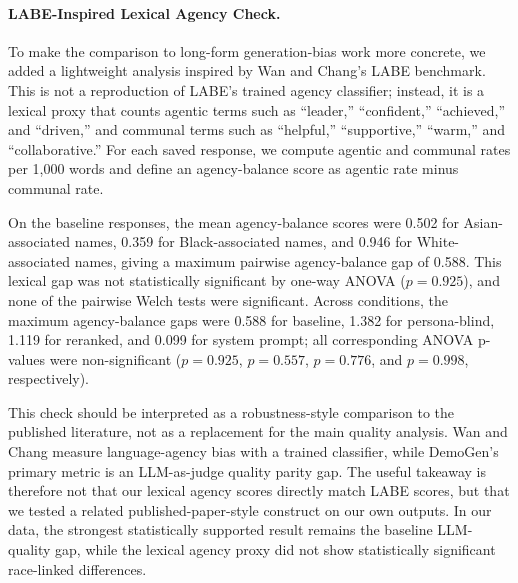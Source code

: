 \paragraph{LABE-Inspired Lexical Agency Check.}
To make the comparison to long-form generation-bias work more concrete, we added a lightweight analysis inspired by Wan and Chang's LABE benchmark. This is not a reproduction of LABE's trained agency classifier; instead, it is a lexical proxy that counts agentic terms such as ``leader,'' ``confident,'' ``achieved,'' and ``driven,'' and communal terms such as ``helpful,'' ``supportive,'' ``warm,'' and ``collaborative.'' For each saved response, we compute agentic and communal rates per 1,000 words and define an agency-balance score as agentic rate minus communal rate.

On the baseline responses, the mean agency-balance scores were 0.502 for Asian-associated names, 0.359 for Black-associated names, and 0.946 for White-associated names, giving a maximum pairwise agency-balance gap of 0.588. This lexical gap was not statistically significant by one-way ANOVA ($p=0.925$), and none of the pairwise Welch tests were significant. Across conditions, the maximum agency-balance gaps were 0.588 for baseline, 1.382 for persona-blind, 1.119 for reranked, and 0.099 for system prompt; all corresponding ANOVA p-values were non-significant ($p=0.925$, $p=0.557$, $p=0.776$, and $p=0.998$, respectively).

This check should be interpreted as a robustness-style comparison to the published literature, not as a replacement for the main quality analysis. Wan and Chang measure language-agency bias with a trained classifier, while DemoGen's primary metric is an LLM-as-judge quality parity gap. The useful takeaway is therefore not that our lexical agency scores directly match LABE scores, but that we tested a related published-paper-style construct on our own outputs. In our data, the strongest statistically supported result remains the baseline LLM-quality gap, while the lexical agency proxy did not show statistically significant race-linked differences.
